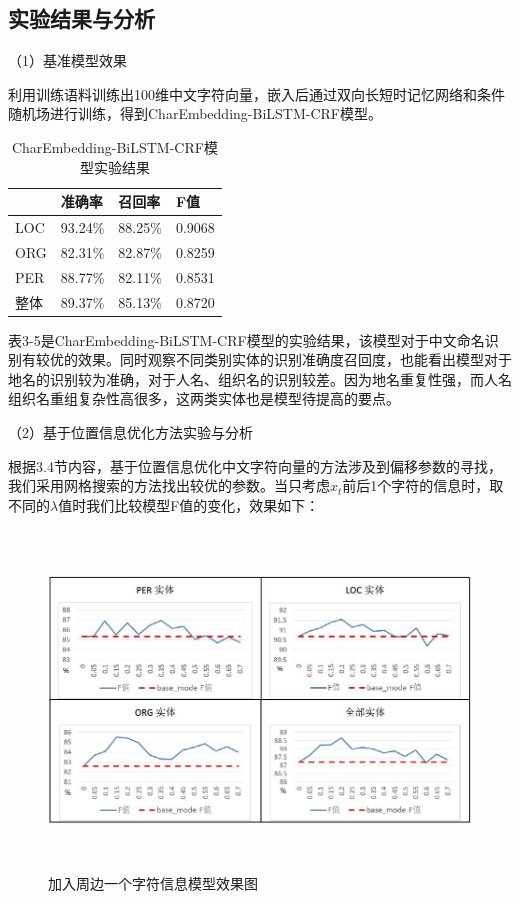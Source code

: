 \documentclass[winfonts,master,oneside,nobackinfo]{njuthesis}
\begin{document}
\subsection{实验结果与分析}

（1）基准模型效果

利用训练语料训练出100维中文字符向量，嵌入后通过双向长短时记忆网络和条件随机场进行训练，得到CharEmbedding-BiLSTM-CRF模型。

\begin{table}[H]
\centering
\begin{tabular}{|l|l|l|l|}
\hline
    & 准确率     & 召回率     & F值    \\ \hline
LOC & 93.24\% & 88.25\% & 0.9068 \\ \hline
ORG & 82.31\% & 82.87\% & 0.8259 \\ \hline
PER & 88.77\% & 82.11\% & 0.8531 \\ \hline
整体  & 89.37\% & 85.13\% & 0.8720 \\ \hline
\end{tabular}
\caption{CharEmbedding-BiLSTM-CRF模型实验结果}
\end{table}

表3-5是CharEmbedding-BiLSTM-CRF模型的实验结果，该模型对于中文命名识别有较优的效果。同时观察不同类别实体的识别准确度召回度，也能看出模型对于地名的识别较为准确，对于人名、组织名的识别较差。因为地名重复性强，而人名组织名重组复杂性高很多，这两类实体也是模型待提高的要点。



（2）基于位置信息优化方法实验与分析

根据3.4节内容，基于位置信息优化中文字符向量的方法涉及到偏移参数的寻找，我们采用网格搜索的方法找出较优的参数。当只考虑$x_{t}$前后1个字符的信息时，取不同的$\lambda$值时我们比较模型F值的变化，效果如下：

\begin{figure}[H]
\centering
\begin{minipage}[t]{\textwidth}
\includegraphics[width=1\textwidth,height=9cm]{./figure/参数1.jpg}
\caption{加入周边一个字符信息模型效果图}
\label{lab:1}
\end{minipage}
\end{figure}
\end{document}
